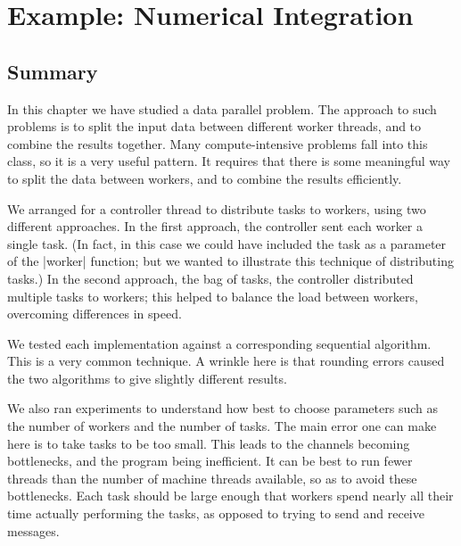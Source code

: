 \chapter{Example: Numerical Integration}
\label{chap:trapezium}



\section{Summary}

In this chapter we have studied a data parallel problem.  The approach to such
problems is to split the input data between different worker threads, and to
combine the results together.  Many compute-intensive problems fall into this
class, so it is a very useful pattern.  It  requires that there is some
meaningful way to split the data between workers, and to combine the results
efficiently.

We arranged for a controller thread to distribute tasks to workers, using two
different approaches.  In the first approach, the controller sent each worker
a single task.  (In fact, in this case we could have included the task as a
parameter of the |worker| function; but we wanted to illustrate this technique
of distributing tasks.)  In the second approach, the bag of tasks, the
controller distributed multiple tasks to workers; this helped to balance the
load between workers, overcoming differences in speed.

We tested each implementation against a corresponding sequential algorithm.
This is a very common technique.  A wrinkle here is that rounding errors
caused the two algorithms to give slightly different results.  

We also ran experiments to understand how best to choose parameters such as
the number of workers and the number of tasks.  The main error one can make
here is to take tasks to be too small.  This leads to the channels becoming
bottlenecks, and the program being inefficient.  It can be best to run fewer
threads than the number of machine threads available, so as to avoid these
bottlenecks.  Each task should be large enough that workers spend nearly all
their time actually performing the tasks, as opposed to trying to send and
receive messages.  


